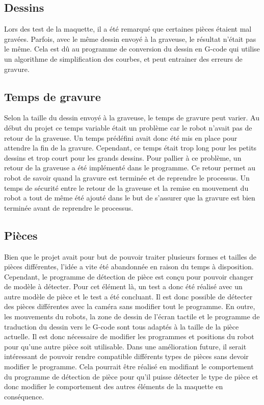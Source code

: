 \subsection{Dessins}
Lors des test de la maquette, il a été remarqué que certaines pièces étaient mal gravées. Parfois, avec le même dessin envoyé à la graveuse, le résultat n'était pas le même. Cela est dû au programme de conversion du dessin en G-code qui utilise un algorithme de simplification des courbes, et peut entrainer des erreurs de gravure.

\subsection{Temps de gravure}
Selon la taille du dessin envoyé à la graveuse, le temps de gravure peut varier. Au début du projet ce temps variable était un problème car le robot n'avait pas de retour de la graveuse. Un temps prédéfini avait donc été mis en place pour attendre la fin de la gravure. Cependant, ce temps était trop long pour les petits dessins et trop court pour les grands dessins. Pour pallier à ce problème, un retour de la graveuse a été implémenté dans le programme. Ce retour permet au robot de savoir quand la gravure est terminée et de reprendre le processus. Un temps de sécurité entre le retour de la graveuse et la remise en mouvement du robot a tout de même été ajouté dans le but de s'assurer que la gravure est bien terminée avant de reprendre le processus.

\subsection{Pièces}
Bien que le projet avait pour but de pouvoir traiter plusieurs formes et tailles de pièces différentes, l'idée a vite été abandonnée en raison du temps à disposition. Cependant, le programme de détection de pièce est conçu pour pouvoir changer de modèle à détecter. Pour cet élément là, un test a donc été réalisé avec un autre modèle de pièce et le test a été concluant. Il est donc possible de détecter des pièces différentes avec la caméra sans modifier tout le programme. En outre, les mouvements du robots, la zone de dessin de l'écran tactile et le programme de traduction du dessin vers le G-code sont tous adaptés à la taille de la pièce actuelle. Il est donc nécessaire de modifier les programmes et positions du robot pour qu'une autre pièce soit utilisable. Dans une amélioration future, il serait intéressant de pouvoir rendre compatible différents types de pièces sans devoir modifier le programme. Cela pourrait être réalisé en modifiant le comportement du programme de détection de pièce pour qu'il puisse détecter le type de pièce et donc modifier le comportement des autres éléments de la maquette en conséquence.

